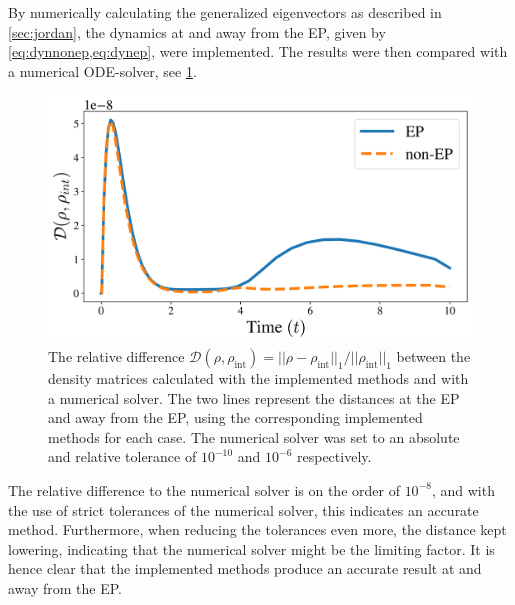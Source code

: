 \documentclass[../main.tex]{subfiles}
\begin{document}
By numerically calculating the generalized eigenvectors as described in \cref{sec:jordan}, the dynamics at and away from the EP, given by \cref{eq:dynnonep,eq:dynep}, were implemented. The results were then compared with a numerical ODE-solver, see \cref{fig:minevsint}.

\begin{figure}[H]
    \centering
    \includegraphics[width=0.6\linewidth]{figures/minevsint.png}
    \caption{The relative difference $\mathcal{D}(\rho, \rho_\text{int}) = ||\rho - \rho_\text{int}||_1/||\rho_\text{int}||_1$ between the density matrices calculated with the implemented methods and with a numerical solver. The two lines represent the distances at the EP and away from the EP, using the corresponding implemented methods for each case. The numerical solver was set to an absolute and relative tolerance of $10^{-10}$ and $10^{-6}$ respectively.}
    \label{fig:minevsint}
\end{figure}
The relative difference to the numerical solver is on the order of $10^{-8}$, and with the use of strict tolerances of the numerical solver, this indicates an accurate method. Furthermore, when reducing the tolerances even more, the distance kept lowering, indicating that the numerical solver might be the limiting factor. It is hence clear that the implemented methods produce an accurate result at and away from the EP. 
\end{document}
